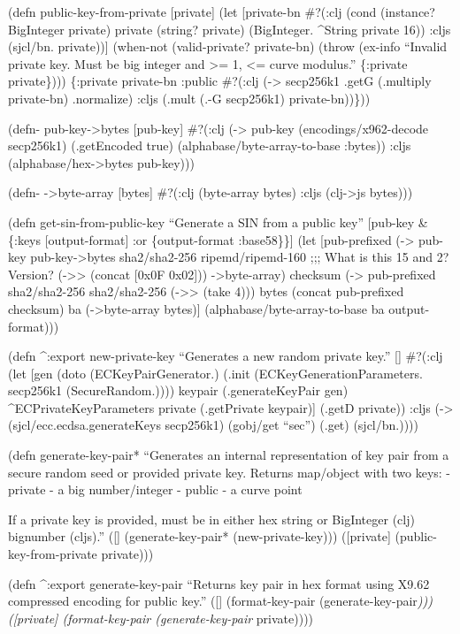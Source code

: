 \documentclass[
]{article}
\begin{document}
(defn public-key-from-private {[}private{]} (let {[}private-bn \#?(:clj
(cond (instance? BigInteger private) private (string? private)
(BigInteger. \^{}String private 16)) :cljs (sjcl/bn. private)){]}
(when-not (valid-private? private-bn) (throw (ex-info ``Invalid private
key. Must be big integer and \textgreater= 1, \textless= curve
modulus.'' \{:private private\}))) \{:private private-bn :public
\#?(:clj (-\textgreater{} secp256k1 .getG (.multiply private-bn)
.normalize) :cljs (.mult (.-G secp256k1) private-bn))\}))

(defn- pub-key-\textgreater bytes {[}pub-key{]} \#?(:clj
(-\textgreater{} pub-key (encodings/x962-decode secp256k1) (.getEncoded
true) (alphabase/byte-array-to-base :bytes)) :cljs
(alphabase/hex-\textgreater bytes pub-key)))

(defn- -\textgreater byte-array {[}bytes{]} \#?(:clj (byte-array bytes)
:cljs (clj-\textgreater js bytes)))

(defn get-sin-from-public-key ``Generate a SIN from a public key''
{[}pub-key \& \{:keys {[}output-format{]} :or \{output-format
:base58\}\}{]} (let {[}pub-prefixed (-\textgreater{} pub-key
pub-key-\textgreater bytes sha2/sha2-256 ripemd/ripemd-160 ;;; What is
this 15 and 2? Version? (-\textgreater\textgreater{} (concat {[}0x0F
0x02{]})) -\textgreater byte-array) checksum (-\textgreater{}
pub-prefixed sha2/sha2-256 sha2/sha2-256 (-\textgreater\textgreater{}
(take 4))) bytes (concat pub-prefixed checksum) ba
(-\textgreater byte-array bytes){]} (alphabase/byte-array-to-base ba
output-format)))

(defn \^{}:export new-private-key ``Generates a new random private
key.'' {[}{]} \#?(:clj (let {[}gen (doto (ECKeyPairGenerator.) (.init
(ECKeyGenerationParameters. secp256k1 (SecureRandom.)))) keypair
(.generateKeyPair gen) \^{}ECPrivateKeyParameters private (.getPrivate
keypair){]} (.getD private)) :cljs (-\textgreater{}
(sjcl/ecc.ecdsa.generateKeys secp256k1) (gobj/get ``sec'') (.get)
(sjcl/bn.))))

(defn generate-key-pair* ``Generates an internal representation of key
pair from a secure random seed or provided private key. Returns
map/object with two keys: - private - a big number/integer - public - a
curve point

If a private key is provided, must be in either hex string or BigInteger
(clj) bignumber (cljs).'' ({[}{]} (generate-key-pair*
(new-private-key))) ({[}private{]} (public-key-from-private private)))

(defn \^{}:export generate-key-pair ``Returns key pair in hex format
using X9.62 compressed encoding for public key.'' ({[}{]}
(format-key-pair (generate-key-pair\emph{))) ({[}private{]}
(format-key-pair (generate-key-pair} private))))
\end{document}
